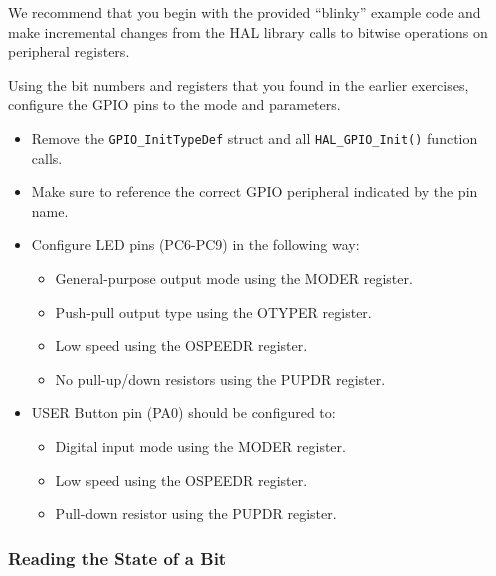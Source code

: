 \documentclass[11pt,fleqn]{book} %
\begin{document}
\newpage
\begin{exercise}
    We recommend that you begin with the provided ``blinky'' example code and make incremental changes from the HAL library calls to bitwise operations on peripheral registers.
    
    
    Using the bit numbers and registers that you found in the earlier exercises, configure the GPIO pins to the mode and parameters. 
    \begin{itemize}
        \item Remove the \texttt{GPIO\_InitTypeDef} struct and all \texttt{HAL\_GPIO\_Init()} function calls.
        \item Make sure to reference the correct GPIO peripheral indicated by the pin name. 
        \item Configure LED pins (PC6-PC9) in the following way:
        \begin{itemize}
            \item General-purpose output mode using the MODER register. 
            \item Push-pull output type using the OTYPER register.
            \item Low speed using the OSPEEDR register. 
            \item No pull-up/down resistors using the PUPDR register. 
        \end{itemize}
        \item USER Button pin (PA0) should be configured to:
        \begin{itemize}
            \item Digital input mode using the MODER register. 
            \item Low speed using the OSPEEDR register. 
            \item Pull-down resistor using the PUPDR register. 
        \end{itemize}
           
    \end{itemize}
\end{exercise}

\subsubsection{Reading the State of a Bit}
\end{document}
